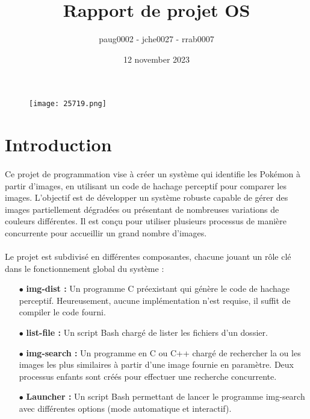 \documentclass{article}
\title{\textbf{Rapport de projet OS}}
\author{paug0002 - jche0027 - rrab0007}
\date{12 november 2023}
\begin{document}
\pagestyle{fancy}
\rhead{}
\lhead{}
\renewcommand{\footrulewidth}{0.5pt}

\maketitle
\begin{figure}[H]
    \centering
    \texttt{[image: 25719.png]}
\end{figure}

\newpage
\renewcommand{\contentsname}{Table des Matières}
\tableofcontents
\newpage

\hspace{1cm}
\section{Introduction}
\hspace{1cm}

\paragraph{}Ce projet de programmation vise à créer un système qui identifie les Pokémon à partir d'images, en utilisant un code de hachage perceptif pour comparer les images. L’objectif est de développer un système robuste capable de gérer des images partiellement dégradées ou présentant de nombreuses variations de couleurs différentes. Il est conçu pour utiliser plusieurs processus de manière concurrente pour accueillir un grand nombre d’images.
\paragraph{}Le projet est subdivisé en différentes composantes, chacune jouant un rôle clé dans le fonctionnement global du système :

\hspace{1.5cm}
\begin{itemize}
    \item[$\bullet$]  \textbf{img-dist :}  Un programme C préexistant qui génère le code de hachage perceptif. Heureusement, aucune implémentation n'est requise, il suffit de compiler le code fourni.
    \item[$\bullet$]  \textbf{list-file :}  Un script Bash chargé de lister les fichiers d'un dossier.
    \item[$\bullet$]  \textbf{img-search :}  Un programme en C ou C++ chargé de rechercher la ou les images les plus similaires à partir d'une image fournie en paramètre. Deux processus enfants sont créés pour effectuer une recherche concurrente.
    \item[$\bullet$]  \textbf{Launcher :}  Un script Bash permettant de lancer le programme img-search avec différentes options (mode automatique et interactif). 
\end{itemize}
\end{document}
